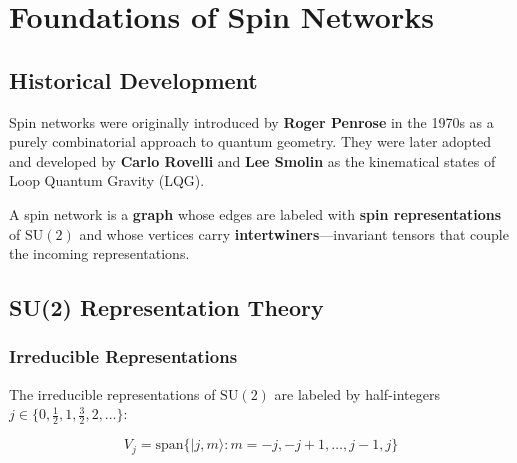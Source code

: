 \documentclass[11pt,a4paper,twoside]{book}
\theoremstyle{definition}
\newcommand{\SU}{\mathrm{SU}}
\begin{document}
\chapter{Foundations of Spin Networks}
\label{ch:spin_network_foundations}

\section{Historical Development}

Spin networks were originally introduced by \textbf{Roger Penrose} in the 1970s 
as a purely combinatorial approach to quantum geometry. They were later 
adopted and developed by \textbf{Carlo Rovelli} and \textbf{Lee Smolin} as 
the kinematical states of Loop Quantum Gravity (LQG).

\begin{conceptbox}
A spin network is a \textbf{graph} whose edges are labeled with 
\textbf{spin representations} of $\SU(2)$ and whose vertices carry 
\textbf{intertwiners}---invariant tensors that couple the incoming 
representations.
\end{conceptbox}

\section{SU(2) Representation Theory}

\subsection{Irreducible Representations}

The irreducible representations of $\SU(2)$ are labeled by half-integers 
$j \in \{0, \frac{1}{2}, 1, \frac{3}{2}, 2, \ldots\}$:

\begin{equation}
    V_j = \text{span}\{|j, m\rangle : m = -j, -j+1, \ldots, j-1, j\}
\end{equation}
\end{document}
